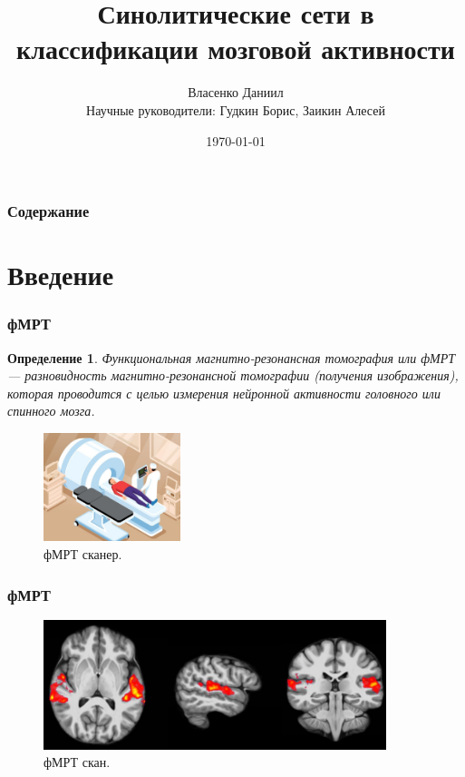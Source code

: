 \documentclass{beamer}
\newtheorem{definition_}{Определение}
\begin{document}
	\title{Синолитические сети в классификации мозговой активности}  
	\author{Власенко Даниил\\
	{\footnotesize Научные руководители: Гудкин Борис, Заикин Алесей}}
	\date{\today} 
	
	\begin{frame}
		\titlepage
	\end{frame}

	\begin{frame}
		\frametitle{Содержание}
		\tableofcontents
	\end{frame} 

	\section{Введение} 
	\begin{frame}
		\frametitle{фМРТ} 
							
		\begin{definition_}
			Функциональная магнитно-резонансная томография или фМРТ — разновидность магнитно-резонансной томографии (получения изображения), которая проводится с целью измерения нейронной активности головного или спинного мозга.
		\end{definition_}
	
		\begin{figure}
			\includegraphics[width=4cm]{../images/fmri_1.jpeg}
			\caption{фМРТ сканер.} 
			\label{fg:1}
		\end{figure}		
	\end{frame}

	\begin{frame} 
		\frametitle{фМРТ}
		\begin{figure}
			\includegraphics[width=10cm]{../images/fmri_2.png}
			\caption{фМРТ скан.} 
			\label{fg:2}
		\end{figure}
	\end{frame}
\end{document}
